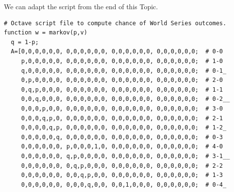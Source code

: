 \begin{exercises}
\begin{answer}
\begin{center}
     \end{center}
     \begin{exparts}
      \partsitem We can adapt the script from the end of this Topic.
\begin{lstlisting}
# Octave script file to compute chance of World Series outcomes.
function w = markov(p,v)
  q = 1-p;
  A=[0,0,0,0,0,0, 0,0,0,0,0,0, 0,0,0,0,0,0, 0,0,0,0,0,0;  # 0-0
     p,0,0,0,0,0, 0,0,0,0,0,0, 0,0,0,0,0,0, 0,0,0,0,0,0;  # 1-0
     q,0,0,0,0,0, 0,0,0,0,0,0, 0,0,0,0,0,0, 0,0,0,0,0,0;  # 0-1_
     0,p,0,0,0,0, 0,0,0,0,0,0, 0,0,0,0,0,0, 0,0,0,0,0,0;  # 2-0
     0,q,p,0,0,0, 0,0,0,0,0,0, 0,0,0,0,0,0, 0,0,0,0,0,0;  # 1-1
     0,0,q,0,0,0, 0,0,0,0,0,0, 0,0,0,0,0,0, 0,0,0,0,0,0;  # 0-2__
     0,0,0,p,0,0, 0,0,0,0,0,0, 0,0,0,0,0,0, 0,0,0,0,0,0;  # 3-0
     0,0,0,q,p,0, 0,0,0,0,0,0, 0,0,0,0,0,0, 0,0,0,0,0,0;  # 2-1
     0,0,0,0,q,p, 0,0,0,0,0,0, 0,0,0,0,0,0, 0,0,0,0,0,0;  # 1-2_
     0,0,0,0,0,q, 0,0,0,0,0,0, 0,0,0,0,0,0, 0,0,0,0,0,0;  # 0-3
     0,0,0,0,0,0, p,0,0,0,1,0, 0,0,0,0,0,0, 0,0,0,0,0,0;  # 4-0
     0,0,0,0,0,0, q,p,0,0,0,0, 0,0,0,0,0,0, 0,0,0,0,0,0;  # 3-1__
     0,0,0,0,0,0, 0,q,p,0,0,0, 0,0,0,0,0,0, 0,0,0,0,0,0;  # 2-2
     0,0,0,0,0,0, 0,0,q,p,0,0, 0,0,0,0,0,0, 0,0,0,0,0,0;  # 1-3
     0,0,0,0,0,0, 0,0,0,q,0,0, 0,0,1,0,0,0, 0,0,0,0,0,0;  # 0-4_

\end{lstlisting}
\end{exparts}
\end{answer}
\end{exercises}

